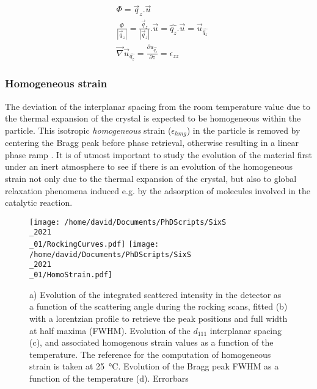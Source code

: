 \begin{align}
    \label{eq:StrainFromPhase1}
    & \Phi =  \vec{q}_z.\vec{u} \\
    \label{eq:StrainFromPhase2}
    & \frac{\Phi}{|\vec{q}_z|} = \frac{\vec{q}_z}{|\vec{q}_z|}.\vec{u} = \hat{q_z}.\vec{u} = \vec{u}_{\hat{q_z}} \\
    \label{eq:StrainFromPhase3}
    & \vec{\nabla} \vec{u}_{\hat{q_z}} = \frac{\partial u_{\hat{q_z}}}{\partial z} = \epsilon_{zz}
\end{align}

\subsubsection{Homogeneous strain}

The deviation of the interplanar spacing from the room temperature value due to the thermal expansion of the crystal is expected to be homogeneous within the particle.
This isotropic \textit{homogeneous} strain ($\epsilon_{hmg}$) in the particle is removed by centering the Bragg peak before phase retrieval, otherwise resulting in a linear phase ramp \parencite{}.
It is of utmost important to study the evolution of the material first under an inert atmosphere to see if there is an evolution of the homogeneous strain not only due to the thermal expansion of the crystal, but also to global relaxation phenomena induced e.g. by the adsorption of molecules involved in the catalytic reaction.


\begin{figure}[!htb]
    \centering
    \texttt{[image: /home/david/Documents/PhDScripts/SixS\\\_2021\\\_01/RockingCurves.pdf]}
    \texttt{[image: /home/david/Documents/PhDScripts/SixS\\\_2021\\\_01/HomoStrain.pdf]}
    \caption{
        a) Evolution of the integrated scattered intensity in the detector as a function of the scattering angle during the rocking scans, fitted (b) with a lorentzian profile to retrieve the peak positions and full width at half maxima (FWHM).
        Evolution of the $d_{111}$ interplanar spacing (c), and associated homogenous strain values as a function of the temperature.
        The reference for the computation of homogeneous strain is taken at \qty{25}{\degreeCelsius}.
        Evolution of the Bragg peak FWHM as a function of the temperature (d).
        \textcolor{Important}{Errorbars}
    }
    \label{fig:HomoStrain}
\end{figure}

